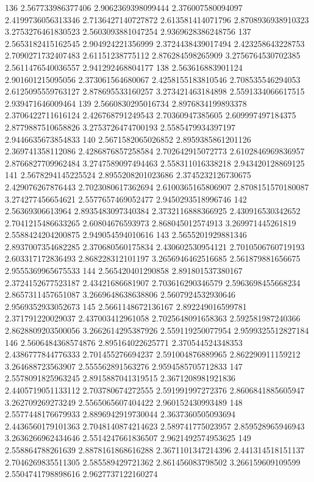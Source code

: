 136 2.567733986377406 2.9062369398099444 2.376007580094097 2.4199736056313346 2.7136427140727872 2.613581414071796 2.8708936938910323 3.2753276461830523 2.5603093881047254 2.9369628386248756
137 2.5653182415162545 2.904924221356999 2.3724438439017494 2.423258643228753 2.7090271732407483 2.61151238775112 2.876284598265909 3.2756764530702385 2.5611476540036557 2.941292468804177
138 2.563616883901124 2.901601215095056 2.373061564680067 2.4258155183810546 2.708535546294053 2.6125095559763127 2.878695533160257 3.273421463184898 2.5591334066617515 2.939471646009464
139 2.5660830295016734 2.8976834199893378 2.3706422711616124 2.426768791249543 2.70360947385605 2.609997497184375 2.8779887510658826 3.2753726474700193 2.5585479934397197 2.9446635673854833
140 2.5671582065026852 2.8959385861201126 2.369741358112086 2.4286876857258584 2.702642915072773 2.6102846969836957 2.8766827709962484 3.2747589097494463 2.558311016338218 2.943420128869125
141 2.5678294145225524 2.8955208201023686 2.3745232126730675 2.429076267876443 2.7023080617362694 2.6100365165806907 2.8708151570180087 3.274277456654621 2.5577657469052477 2.9450293518996746
142 2.56369306613964 2.8935483097340384 2.3732116888366925 2.430916530342652 2.7041215486633265 2.60804676593973 2.868045012574913 3.269971445261819 2.5588424204200875 2.949054594010616
143 2.5655201929881346 2.8937007354682285 2.370680560175834 2.430602530954121 2.7010506760719193 2.603317172836493 2.868228312101197 3.2656946462516685 2.561879881656675 2.9555369965675533
144 2.565420401290858 2.891801537380167 2.3724152677523187 2.43421686681907 2.703616290346579 2.5963698455668234 2.8657311457651087 3.2669648638638806 2.5607924532930646 2.9569352933052673
145 2.5661148672136167 2.892249016599781 2.371791220029037 2.437003412961058 2.7025648091658363 2.592581987240366 2.8628809203500056 3.2662614295387926 2.559119250077954 2.9599325512827184
146 2.5606484368574876 2.895164022625771 2.370544524348353 2.4386777844776333 2.701455276694237 2.591004876889965 2.862290911159212 3.264688723563907 2.555562891563276 2.9594585705712833
147 2.5578091825963245 2.8915887041319515 2.3671208981921836 2.4405719051133112 2.703780674272555 2.591991997272376 2.8606841885605947 3.262709269273249 2.5565065607404422 2.960152430993489
148 2.5577448176679933 2.8896942919730044 2.3637360505093694 2.4436560179101363 2.7048140874214623 2.589741775023957 2.859528965946943 3.2636266962434646 2.5514247661836507 2.9621492574953625
149 2.558864788261639 2.8878161868616288 2.3671101347214396 2.441314518151137 2.7046269835511305 2.585589429721362 2.861456083798502 3.266159609109599 2.5504741798898616 2.9627737122160274
